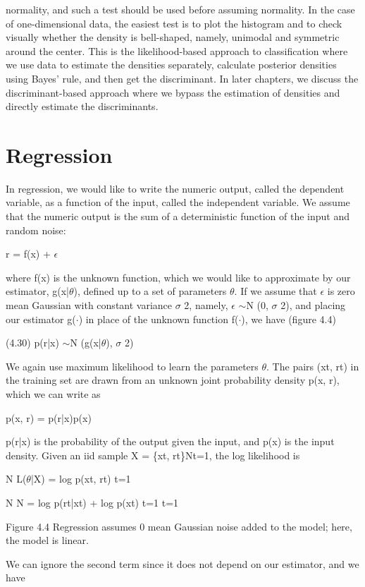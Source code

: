 normality, and such a test should be used before assuming normality. In the case of one-dimensional data, the easiest test is to plot the histogram and to check visually whether the density is bell-shaped, namely, unimodal and symmetric around the center. This is the likelihood-based approach to classification where we use data to estimate the densities separately, calculate posterior densities using Bayes’ rule, and then get the discriminant. In later chapters, we discuss the discriminant-based approach where we bypass the estimation of densities and directly estimate the discriminants.

\section{Regression}

In regression, we would like to write the numeric output, called the dependent variable, as a function of the input, called the independent variable. We assume that the numeric output is the sum of a deterministic function of the input and random noise:

r = f(x) + $\epsilon$

where f(x) is the unknown function, which we would like to approximate by our estimator, g(x|$\theta$), defined up to a set of parameters $\theta$. If we assume that $\epsilon$ is zero mean Gaussian with constant variance $\sigma$ 2, namely, $\epsilon$ $\sim$N (0, $\sigma$ 2), and placing our estimator g($\cdot$) in place of the unknown function f($\cdot$), we have (figure 4.4)

(4.30) p(r|x) $\sim$N (g(x|$\theta$), $\sigma$ 2)

We again use maximum likelihood to learn the parameters $\theta$. The pairs (xt, rt) in the training set are drawn from an unknown joint probability density p(x, r), which we can write as

p(x, r) = p(r|x)p(x)

p(r|x) is the probability of the output given the input, and p(x) is the input density. Given an iid sample X = \{xt, rt\}Nt=1, the log likelihood is

N L($\theta$|X) = log p(xt, rt) t=1

N N = log p(rt|xt) + log p(xt) t=1 t=1

Figure 4.4 Regression assumes 0 mean Gaussian noise added to the model; here, the model is linear.

We can ignore the second term since it does not depend on our estimator, and we have


